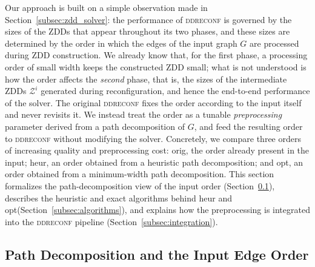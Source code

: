 \documentclass[conference]{IEEEtran}
\newcommand{\Z}{\mathcal{Z}}
\newcommand{\OrigDecom}{\textsf{orig}\xspace}
\newcommand{\HeurDecom}{\textsf{heur}\xspace}
\newcommand{\OptDecom}{\textsf{opt}\xspace}
\begin{document}


Our approach is built on a simple observation made in
Section~\ref{subsec:zdd_solver}: the performance of \textsc{ddreconf} is governed
by the sizes of the ZDDs that appear throughout its two phases, and these sizes
are determined by the order in which the edges of the input graph $G$ are
processed during ZDD construction. We already know that, for the first phase, a
processing order of small width keeps the constructed ZDD small; what is not
understood is how the order affects the \emph{second} phase, that is, the sizes
of the intermediate ZDDs $\Z^{i}$ generated during reconfiguration, and hence the
end-to-end performance of the solver. The original \textsc{ddreconf} fixes the
order according to the input itself and never revisits it. We instead treat the
order as a tunable \emph{preprocessing} parameter derived from a path
decomposition of $G$, and feed the resulting order to \textsc{ddreconf} without
modifying the solver. Concretely, we compare three orders of increasing quality
and preprocessing cost: \OrigDecom, the order already present in the input;
\HeurDecom, an order obtained from a heuristic path decomposition; and
\OptDecom, an order obtained from a minimum-width path decomposition. This
section formalizes the path-decomposition view of the input order
(Section~\ref{subsec:pathdecomp}), describes the heuristic and exact algorithms
behind \HeurDecom and \OptDecom (Section~\ref{subsec:algorithms}), and explains
how the preprocessing is integrated into the \textsc{ddreconf} pipeline
(Section~\ref{subsec:integration}).

\subsection{Path Decomposition and the Input Edge Order}
\label{subsec:pathdecomp}
\end{document}
